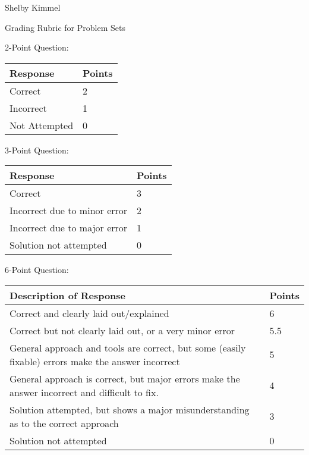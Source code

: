 \documentclass[12pt,landscape]{article}
\begin{document}
\hfill Shelby Kimmel

\begin{center}
{\huge Grading Rubric for Problem Sets}
\end{center}
\bigskip
\begin{multicols}{2}


{\large 2-Point Question:}


{\renewcommand{\arraystretch}{2}
\begin{tabular}{|p{4cm}|p{3cm}|}
\hline
{\bf Response}& {\bf Points}\\
\hline
  Correct &2 \\
  \hline 
  Incorrect &1 \\
  \hline
  Not Attempted &0 \\
  \hline
\end{tabular}}

\bigskip\bigskip
{\large 3-Point Question:}


{\renewcommand{\arraystretch}{2}
\begin{tabular}{|p{5cm}|p{2cm}|}
\hline
{\bf Response}& {\bf Points}\\
\hline
  Correct &3 \\  
  Incorrect due to minor error &2 \\  
  Incorrect due to major error &1 \\  
  Solution not attempted &0 \\
  \hline
\end{tabular}}

\vfill
\vspace{1cm}

{\large 6-Point Question:}


{\renewcommand{\arraystretch}{2}
\begin{tabular}{|p{7.5cm}|p{2cm}|}
\hline
{\bf Description of Response}& {\bf Points}\\
\hline
  Correct and clearly laid out/explained & 6\\
  \hline
  Correct but not clearly laid out, or a very minor error &5.5 \\
  \hline  
  General approach and tools are correct, but some (easily fixable) errors make the answer incorrect &5 \\
  \hline  
  General approach is correct, but major errors make the answer incorrect and difficult to fix. &4 \\
  \hline  
  Solution attempted, but shows a major misunderstanding as to the correct approach & 3\\
  \hline
  Solution not attempted &0 \\
  \hline
\end{tabular}}


\end{multicols}
\end{document}
